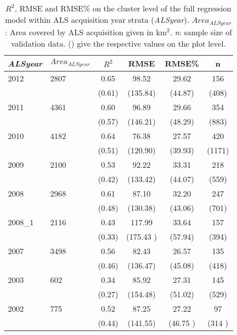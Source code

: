 \begin{table}[ht]
	\begin{center}
		\caption{$R^2$, RMSE and RMSE\% on the cluster level of the full regression model within ALS acquisition year strata (\textit{ALSyear}). $Area_{ALSyear}$: Area covered by ALS acquisition given in km$^2$. \textit{n}: sample size of validation data. () give the respective values on the plot level.}
		\label{tab:adj_r2_within}
		{\small %
			\begin{tabular}{llcccc}
				\hline
				\textit{ALSyear} & $Area_{ALSyear}$ & $R^2$ & RMSE & RMSE\% & n \\ 
				\hline \hline
				2012  & 2807  &  0.65  &  98.52  &  29.62 &  156  \\ 
				&&             (0.61) & (135.84) & (44.87) & (408) \\ \hline

				2011  & 4361  &  0.60   & 96.89   &  29.66 & 354  \\ 
				&&             (0.57)  & (146.21) & (48.29) & (883) \\ \hline

				2010 & 4182     & 0.64  & 76.38   & 27.57 & 420 \\ 
				&&             (0.51)  & (120.90) & (39.93) & (1171) \\ \hline
  
				2009 & 2100     & 0.53  & 92.22  & 33.31 & 218  \\   
				&&             (0.42)  & (133.42) & (44.07) & (559) \\ \hline
             
				2008 & 2968     & 0.61  & 87.10   & 32.20 & 247  \\        
				&&             (0.48)  & (130.38) & (43.06) & (701) \\ \hline
	                    
				2008\_1 & 2116  & 0.43  & 117.99  & 33.64 & 157  \\      
				&&             (0.33)  & (175.43 ) & (57.94) & (394) \\ \hline
         
				2007 & 3498     & 0.56  & 82.43  & 26.57 & 135 \\ 
				&&             (0.46)  & (136.47)  & (45.08) & (418) \\ \hline
	
				2003 & 602      & 0.34  & 85.92  & 27.31 & 145  \\ 
				&&             (0.27)  & (154.48) & (51.02) & (529) \\ \hline
		
				2002 & 775      & 0.52  & 87.25  & 27.22 & 97  \\ 
				&&             (0.44) & (141.55) & (46.75 ) & (314 ) \\
				\hline
				\hline
			\end{tabular}
		}%
	\end{center}
\end{table}



